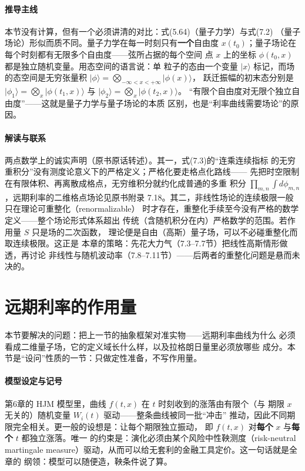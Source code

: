 \paragraph{推导主线}
本节没有计算，但有一个必须讲清的对比：式(5.64)（量子力学）与式(7.2)
（量子场论）形似而质不同。量子力学在每一时刻只有\textbf{一个}自由度
$x(t_0)$；量子场论在每个时刻都有无限多个自由度——弦所占据的每个空间
点 $x$ 上的坐标 $\phi(t_0,x)$ 都是独立随机变量。用态空间的语言说：单
粒子的态由一个变量 $|x\rangle$ 标记，而场的态空间是无穷张量积
$\vert\phi\rangle=\bigotimes_{-\infty<x<+\infty}\vert\phi(x)\rangle$，
跃迁振幅的初末态分别是
$\vert\phi_1\rangle=\bigotimes_x\vert\phi(t_1,x)\rangle$ 与
$\vert\phi_2\rangle=\bigotimes_x\vert\phi(t_2,x)\rangle$。
“有限个自由度对无限个独立自由度”——这就是量子力学与量子场论的本质
区别，也是“利率曲线需要场论”的原因。

\paragraph{解读与联系}
两点数学上的诚实声明（原书原话转述）。其一，式(7.3)的“连乘连续指标
的无穷重积分”没有测度论意义下的严格定义；严格化要走格点化路线——
先把时空限制在有限体积、再离散成格点，无穷维积分就约化成普通的多重
积分 $\prod_{m,n}\int d\phi_{m,n}$，远期利率的二维格点场论见原书附录
7.18。其二，非线性场论的连续极限一般只在理论可重整化（renormalizable）
时才存在，重整化手续至今没有严格的数学定义——整个场论形式体系超出
传统（含随机积分在内）严格数学的范围。若作用量 $S$ 只是场的二次函数，
理论便是自由（高斯）量子场，可以不必碰重整化而取连续极限。这正是
本章的策略：先花大力气（7.3--7.7节）把线性高斯情形做透，再讨论
非线性与随机波动率（7.8--7.11节）——后两者的重整化问题是悬而未决的。

\section{远期利率的作用量}

本节要解决的问题：把上一节的抽象框架对准实物——远期利率曲线为什么
必须看成二维量子场，它的定义域长什么样，以及拉格朗日量里必须放哪些
成分。本节是“设问”性质的一节：只做定性准备，不写作用量。

\paragraph{模型设定与记号}
第6章的 HJM 模型里，曲线 $f(t,x)$ 在 $t$ 时刻收到的涨落由有限个（与
期限 $x$ 无关的）随机变量 $W_i(t)$ 驱动——整条曲线被同一批“冲击”
推动，因此不同期限完全相关。更一般的设想是：让每个期限独立振动，
即 $f(t,x)$ 对\textbf{每个} $x$ 与\textbf{每个} $t$ 都独立涨落。唯一
的约束是：演化必须由某个风险中性鞅测度（risk-neutral martingale
measure）驱动，从而可以给无套利的金融工具定价。这一句话就是全章的
纲领：模型可以随便造，鞅条件说了算。

